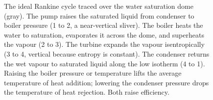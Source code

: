 \begin{figure}[htbp]
\begin{tikzpicture}
\end{tikzpicture}
\caption[Rankine cycle on the temperature-entropy diagram]{The ideal Rankine
cycle traced over the water saturation dome (gray). The pump raises the
saturated liquid from condenser to boiler pressure (1 to 2, a near-vertical
sliver). The boiler heats the water to saturation, evaporates it across the
dome, and superheats the vapour (2 to 3). The turbine expands the vapour
isentropically (3 to 4, vertical because entropy is constant). The condenser
returns the wet vapour to saturated liquid along the low isotherm (4 to 1).
Raising the boiler pressure or temperature lifts the average temperature of
heat addition; lowering the condenser pressure drops the temperature of heat
rejection. Both raise efficiency.}
\label{fig:vol04ch03:rankine-ts}
\end{figure}
